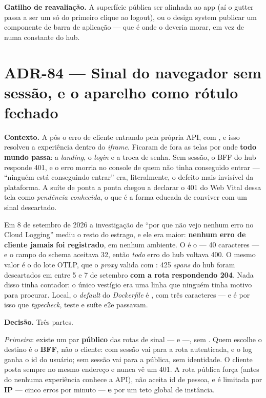 \textbf{Gatilho de reavaliação.} A superfície pública ser alinhada ao app (aí o
gutter passa a ser um só do primeiro clique ao logout), ou o design system
publicar um componente de barra de aplicação --- que é onde o  deveria
morar, em vez de numa constante do hub.
\section{ADR-84 --- Sinal do navegador \textbf{sem sessão}, e o aparelho como
rótulo fechado}
\label{adr:erro-de-cliente-publico}

\textbf{Contexto.} A  pôs o erro de cliente entrando pela própria
API, com , e isso resolveu a experiência dentro do \emph{iframe}.
Ficaram de fora as telas por onde \textbf{todo mundo passa}: a \emph{landing}, o
\emph{login} e a troca de senha. Sem sessão, o BFF do hub responde 401, e o erro
morria no console de quem não tinha conseguido entrar --- \enquote{ninguém está
conseguindo entrar} era, literalmente, o defeito mais invisível da plataforma. A
suíte de ponta a ponta chegou a declarar o 401 do Web Vital dessa tela como
\emph{pendência conhecida}, o que é a forma educada de conviver com um sinal
descartado.

Em 8 de setembro de 2026 a investigação de \enquote{por que não vejo nenhum erro
no Cloud Logging} mediu o resto do estrago, e ele era maior: \textbf{nenhum erro
de cliente jamais foi registrado}, em nenhum ambiente. O
 é o  --- 40 caracteres --- e o
campo  do schema aceitava 32, então \emph{todo} erro do hub voltava
400. O mesmo valor é o  do lote OTLP, que o \emph{proxy}
valida com : 425 \emph{spans} do hub foram descartados em
 entre 5 e 7 de setembro \textbf{com a rota respondendo 204}. Nada disso
tinha contador: o único vestígio era uma linha  que ninguém
tinha motivo para procurar. Local, o \emph{default} do \emph{Dockerfile} é
, com três caracteres --- e é por isso que \emph{typecheck}, teste e
suíte e2e passavam.

\textbf{Decisão.} Três partes.

\emph{Primeira}: existe um par \textbf{público} das rotas de sinal ---
 e
 ---, sem . Quem
escolhe o destino é o \textbf{BFF}, não o cliente: com sessão vai para a rota
autenticada, e o log ganha o id do usuário; sem sessão vai para a pública, sem
identidade. O cliente posta sempre no mesmo endereço e nunca vê um 401. A rota
pública força  (antes do  nenhuma experiência
conhece a API), não aceita id de pessoa, e é limitada por \textbf{IP} --- cinco
erros por minuto --- \textbf{e} por um teto global de instância.

